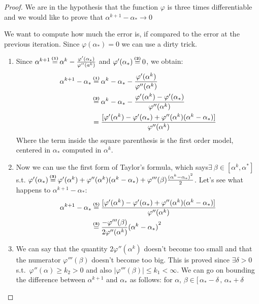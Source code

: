 \documentclass[ComputationalMathematics.tex]{subfiles}
\begin{document}
\begin{proof}
  We are in the hypothesis that the function $\varphi$ is three times differentiable and we would like to prove that $\alpha^{k+1} - \alpha_* \rightarrow 0$

We want to compute how much the error is, if compared to the error at the previous iteration.
  Since $\varphi(\alpha_{*}) = 0$ we can use a dirty trick. 
  \begin{enumerate}
    \item Since $\alpha^{k+1} \numeq{(1)} \alpha^k - \frac{\varphi'({\alpha}_*)}{\varphi''(a^k)}$ and $\varphi'(\alpha_*) \numeq{(2)} 0$, we obtain:
  \begin{equation}
    \begin{split}
      \alpha^{k+1} - \alpha_* & \numeq{(1)} \alpha^k - \alpha_* - \frac{\varphi'(\alpha^k)}{\varphi''(\alpha^k)}\\
      & \numeq{(2)} \alpha^k - \alpha_* - \frac{\varphi'(\alpha^k) - \varphi'(\alpha_*)}{\varphi''(\alpha^k)}\\
      & = \frac{[\varphi'(\alpha^k) -\varphi'(\alpha_*) + \varphi''(\alpha^k) (\alpha^k - \alpha_*)]}{\varphi''(\alpha^k)} 
    \end{split}
  \end{equation}
 Where the term inside the square parenthesis  is the first order model, centered in $\alpha_*$ computed in $\alpha^k$.
  \item Now we can use the first form of Taylor's formula, which says$\exists ~ \beta \in [\alpha^k, \alpha^*]$ s.t. $\varphi'(\alpha_{*}) \numeq{(3)} \varphi'(\alpha^{k}) + \varphi''(\alpha^{k}) (\alpha^{k} - \alpha_{*}) + \varphi'''(\beta) \frac{{(\alpha^{k} - \alpha_{*})}^{2}}{2}$.
    Let's see what happens to $\alpha^{k+1} - \alpha_*$:
  \begin{equation}
    \begin{split}
      \alpha^{k+1} - \alpha_* & \numeq{(5)} \frac{[\varphi'(\alpha^k) -\varphi'(\alpha_*) + \varphi''(\alpha^k) (\alpha^k - \alpha_*)]}{\varphi''(\alpha^k)}\\
      & \numeq{(3)} \frac{-\varphi'''(\beta)}{2 \varphi''(\alpha^k)} {(\alpha^k - \alpha_*)}^2
    \end{split}
  \end{equation}
\item We can say that the quantity $2\varphi''(\alpha^{k})$ doesn't become too small and that the numerator $\varphi'''(\beta)$ doesn't become too big. This is proved since $\exists \delta > 0$ s.t.~$\varphi''(\alpha) \geq k_2 > 0$ and also  $| \varphi'''(\beta) | \leq k_1 < \infty$. We can go on bounding the difference between $\alpha^{k+1}$ and $\alpha_*$ as follows: for $\alpha$, $\beta \in [ \, \alpha_* - \delta \,,\, \alpha_* + \delta$
       

\end{enumerate}
\end{proof}
\end{document}
